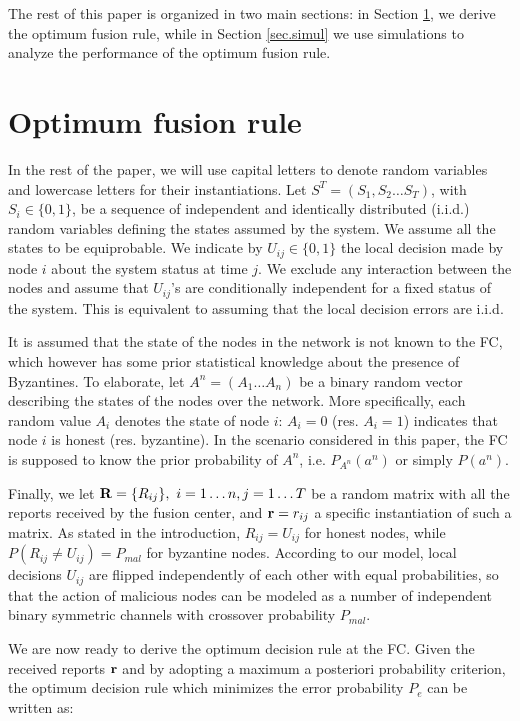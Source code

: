 \documentclass[10pt,peerreview,draftcls,onecolumn]{IEEEtran}
\begin{document}
The rest of this paper is organized in two main sections: in Section \ref{sec.PRstates}, we derive the optimum fusion rule, while in Section \ref{sec.simul} we use simulations to analyze the performance of the optimum fusion rule.
\section{Optimum fusion rule}
\label{sec.PRstates}

In the rest of the paper, we will use capital letters to denote random variables and lowercase letters for their instantiations.
Let $S^T = (S_1, S_2 \dots S_T)$, with $S_i \in \{0,1\}$, be a sequence of independent and identically distributed (i.i.d.) random variables defining the states assumed by the system. We assume all the states to be equiprobable.
We indicate by $U_{ij} \in \{0,1\}$ the local decision made by node $i$ about the system status at time $j$. We exclude any interaction between the nodes and assume that $U_{ij}$'s are conditionally independent for a fixed status of the system. This is equivalent to assuming that the local decision errors are i.i.d.

It is assumed that the state of the nodes in the network is not known to the FC, which however has some prior statistical knowledge about the presence of Byzantines. To elaborate, let $A^n = (A_1 \dots A_n)$ be a binary random vector describing the states of the nodes over the network. More specifically, each random value $A_i$ denotes the state of node $i$: $A_i = 0$ (res. $A_i = 1$) indicates that node $i$ is honest (res. byzantine). In the scenario considered in this paper, the FC is supposed to know the prior probability  of $A^n$, i.e. $P_{A^n}(a^n)$ or simply $P(a^n)$.

Finally, we let ${\bf R} = \{R_{ij}\}, ~ i = 1 \dots n, j = 1 \dots T$ be a random matrix with all the reports received by the fusion center, and ${\bf r} = r_{ij}$ a specific instantiation of such a matrix. As stated in the introduction, $R_{ij} = U_{ij}$ for honest nodes, while $P(R_{ij} \ne U_{ij}) = P_{mal}$ for byzantine nodes. According to our model, local decisions $U_{ij}$ are flipped independently of each other with equal probabilities, so that the action of malicious nodes can be modeled as a number of independent binary symmetric channels with crossover probability $P_{mal}$.

We are now ready to derive the optimum decision rule at the FC. Given the received reports ${\bf r}$ and by adopting a maximum a posteriori probability criterion, the optimum decision rule which minimizes the error probability $P_e$ can be written as:
\end{document}

